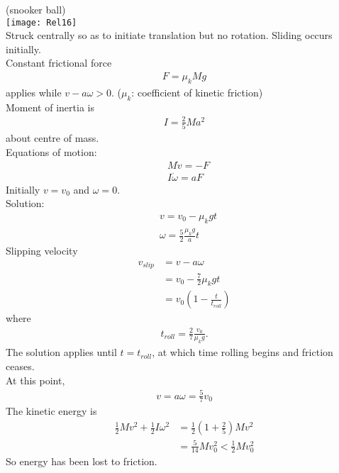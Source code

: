 \documentclass[a4paper]{article}
\begin{document}
\begin{eg}(snooker ball)\\
\texttt{[image: Rel16]}\\
Struck centrally so as to initiate translation but no rotation. Sliding occurs initially.\\
Constant frictional force
\begin{equation*}
\begin{aligned}
F=\mu_k Mg
\end{aligned}
\end{equation*}
applies while $v-a\omega >0$. ($\mu_k$: coefficient of kinetic friction)\\
Moment of inertia is
\begin{equation*}
\begin{aligned}
I=\frac{2}{5}Ma^2
\end{aligned}
\end{equation*}
about centre of mass.\\
Equations of motion:
\begin{equation*}
\begin{aligned}
&M\dot{v}=-F\\
&I\dot{\omega}=aF
\end{aligned}
\end{equation*}
Initially $v=v_0$ and $\omega =0$.\\
Solution:
\begin{equation*}
\begin{aligned}
&v=v_0-\mu_k gt\\
&\omega=\frac{5}{2}\frac{\mu_k g}{a}t
\end{aligned}
\end{equation*}
Slipping velocity
\begin{equation*}
\begin{aligned}
v_{slip} &= v-a\omega\\
&= v_0 - \frac{7}{2}\mu_k gt\\
&= v_0 \left(1-\frac{t}{t_{roll}}\right)
\end{aligned}
\end{equation*}
where
\begin{equation*}
\begin{aligned}
t_{roll} = \frac{2}{7}\frac{v_0}{\mu_k g}.
\end{aligned}
\end{equation*}
The solution applies until $t=t_{roll}$, at which time rolling begins and friction ceases.\\
At this point,
\begin{equation*}
\begin{aligned}
v=a\omega = \frac{5}{7}v_0
\end{aligned}
\end{equation*}
The kinetic energy is
\begin{equation*}
\begin{aligned}
\frac{1}{2}Mv^2 + \frac{1}{2}I\omega^2 &= \frac{1}{2}\left(1+\frac{2}{5}\right)Mv^2\\
&=\frac{5}{14}Mv_0^2 < \frac{1}{2}Mv_0^2
\end{aligned}
\end{equation*}
So energy has been lost to friction.
\end{eg}
\end{document}
